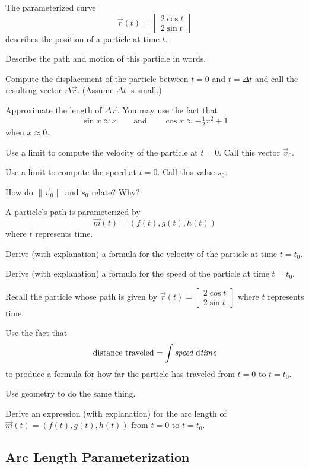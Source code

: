 \documentclass{problemset}
\newcommand{\mat}[1]{\begin{bmatrix}#1\end{bmatrix}}
\begin{document}
	\question
	The parameterized curve
	\[
		\vec r(t) = \mat{2\cos t\\2\sin t}
	\]
	describes the position of a particle at time $t$.
	\begin{parts}
		\item Describe the path and motion of this particle in words.
		\item Compute the displacement  of the particle between $t=0$
			and $t=\Delta t$ and call the resulting vector $\Delta \vec r$.  
			(Assume $\Delta t$ is small.)
		\item Approximate the length of $\Delta \vec r$.  You may use the fact that
			\[
				\sin x\approx x\qquad\text{and}\qquad \cos x\approx -\tfrac{1}{2}x^2+1
			\]
			when $x\approx 0$.
		\item Use a limit to compute the velocity of the particle at $t=0$. Call this 
			vector $\vec v_0$.
		\item Use a limit to compute the speed at $t=0$.  Call this value $s_0$.
		\item How do $\|\vec v_0\|$ and $s_0$ relate?  Why?
	\end{parts}

	\question
	A particle's path is parameterized by
	\[
		\vec m(t) = (f(t), g(t), h(t))
	\]
	where $t$ represents time.
	\begin{parts}
		\item Derive (with explanation) a formula for the velocity of
			the particle at time $t=t_0$.
		\item Derive (with explanation) a formula for the speed of
			the particle at time $t=t_0$.
	\end{parts}
	
	\question
	Recall the particle whose path is given by
	$
		\vec r(t) = \mat{2\cos t\\2\sin t}
	$
	where $t$ represents time.
	\begin{parts}
		\item Use the fact that
			\[
				\text{distance traveled}=\int\text{\it speed}\ \mathrm{d}\text{\it time}
			\]
		to produce a formula for how far the particle has traveled from $t=0$ to $t=t_0$.
		\item Use geometry to do the same thing.
		\item Derive an expression (with explanation) for the arc length of $\vec m(t) = (f(t), g(t), h(t))$
			from $t=0$ to $t=t_0$.
	\end{parts}

\subsection*{Arc Length Parameterization}
	
\end{document}
